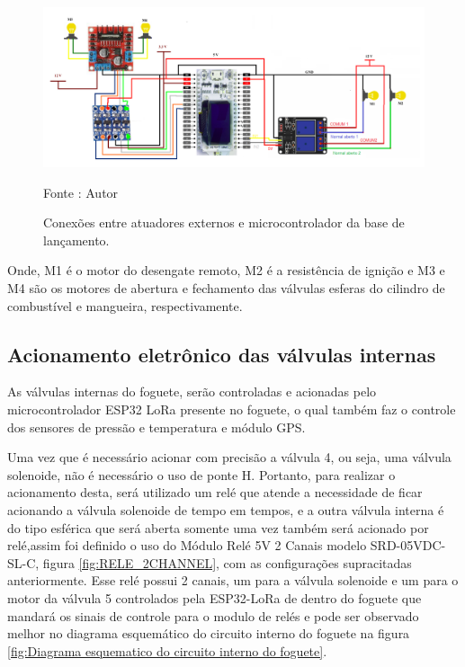 \begin{figure}[H]
  \centering
  \includegraphics[scale=0.5]{figuras/BASE_VALVULAS.png}
  \caption{ Conexões entre atuadores externos e microcontrolador da base de lançamento. } 
  {\footnotesize Fonte : Autor}
  \label{fig:base_valvulas}
\end{figure}

\par Onde, M1 é o motor do desengate remoto, M2 é a resistência de ignição e M3 e M4 são os motores de abertura e fechamento das válvulas esferas do cilindro de combustível e mangueira, respectivamente.

\subsection{Acionamento eletrônico das válvulas internas}

\par As válvulas internas do foguete, serão controladas e acionadas pelo microcontrolador ESP32 LoRa presente no foguete, o qual também faz o controle dos sensores de pressão e temperatura e módulo GPS.

\par Uma vez que é necessário acionar com precisão a válvula 4, ou seja, uma válvula solenoide, não é necessário o uso de ponte H. Portanto, para realizar o acionamento desta, será utilizado um relé que atende a necessidade de ficar acionando a válvula solenoide de tempo em tempos, e a outra válvula interna é do tipo esférica que será aberta somente uma vez também será acionado por relé,assim foi definido o uso do Módulo Relé 5V 2 Canais modelo SRD-05VDC-SL-C, figura \ref{fig:RELE_2CHANNEL}, com as configurações supracitadas anteriormente. Esse relé possui 2 canais, um para a válvula solenoide e um para o motor da válvula 5 controlados pela ESP32-LoRa de dentro do foguete que mandará os sinais de controle para o modulo de relés e pode ser observado melhor no diagrama esquemático do circuito interno do foguete na figura \ref{fig:Diagrama esquematico do circuito interno do foguete}.

